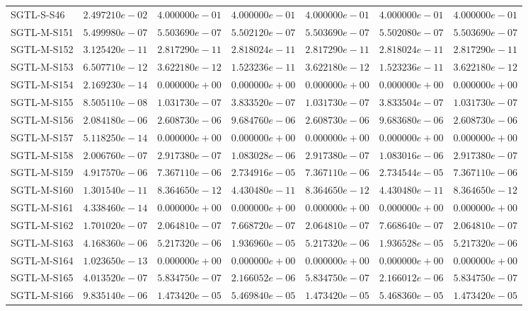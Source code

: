 \begin{longtable}{lrrrrrr}
SGTL-S-S46 & $2.497210e-02$ & $4.000000e-01$ & $4.000000e-01$ & $4.000000e-01$ & $4.000000e-01$ & $4.000000e-01$ \\
SGTL-M-S151 & $5.499980e-07$ & $5.503690e-07$ & $5.502120e-07$ & $5.503690e-07$ & $5.502080e-07$ & $5.503690e-07$ \\
SGTL-M-S152 & $3.125420e-11$ & $2.817290e-11$ & $2.818024e-11$ & $2.817290e-11$ & $2.818024e-11$ & $2.817290e-11$ \\
SGTL-M-S153 & $6.507710e-12$ & $3.622180e-12$ & $1.523236e-11$ & $3.622180e-12$ & $1.523236e-11$ & $3.622180e-12$ \\
SGTL-M-S154 & $2.169230e-14$ & $0.000000e+00$ & $0.000000e+00$ & $0.000000e+00$ & $0.000000e+00$ & $0.000000e+00$ \\
SGTL-M-S155 & $8.505110e-08$ & $1.031730e-07$ & $3.833520e-07$ & $1.031730e-07$ & $3.833504e-07$ & $1.031730e-07$ \\
SGTL-M-S156 & $2.084180e-06$ & $2.608730e-06$ & $9.684760e-06$ & $2.608730e-06$ & $9.683680e-06$ & $2.608730e-06$ \\
SGTL-M-S157 & $5.118250e-14$ & $0.000000e+00$ & $0.000000e+00$ & $0.000000e+00$ & $0.000000e+00$ & $0.000000e+00$ \\
SGTL-M-S158 & $2.006760e-07$ & $2.917380e-07$ & $1.083028e-06$ & $2.917380e-07$ & $1.083016e-06$ & $2.917380e-07$ \\
SGTL-M-S159 & $4.917570e-06$ & $7.367110e-06$ & $2.734916e-05$ & $7.367110e-06$ & $2.734544e-05$ & $7.367110e-06$ \\
SGTL-M-S160 & $1.301540e-11$ & $8.364650e-12$ & $4.430480e-11$ & $8.364650e-12$ & $4.430480e-11$ & $8.364650e-12$ \\
SGTL-M-S161 & $4.338460e-14$ & $0.000000e+00$ & $0.000000e+00$ & $0.000000e+00$ & $0.000000e+00$ & $0.000000e+00$ \\
SGTL-M-S162 & $1.701020e-07$ & $2.064810e-07$ & $7.668720e-07$ & $2.064810e-07$ & $7.668640e-07$ & $2.064810e-07$ \\
SGTL-M-S163 & $4.168360e-06$ & $5.217320e-06$ & $1.936960e-05$ & $5.217320e-06$ & $1.936528e-05$ & $5.217320e-06$ \\
SGTL-M-S164 & $1.023650e-13$ & $0.000000e+00$ & $0.000000e+00$ & $0.000000e+00$ & $0.000000e+00$ & $0.000000e+00$ \\
SGTL-M-S165 & $4.013520e-07$ & $5.834750e-07$ & $2.166052e-06$ & $5.834750e-07$ & $2.166012e-06$ & $5.834750e-07$ \\
SGTL-M-S166 & $9.835140e-06$ & $1.473420e-05$ & $5.469840e-05$ & $1.473420e-05$ & $5.468360e-05$ & $1.473420e-05$ \\

\end{longtable}
